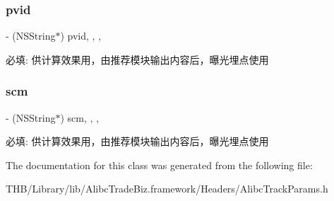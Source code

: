 \subsubsection{\texorpdfstring{pvid}{pvid}}
{\footnotesize\ttfamily -\/ (N\+S\+String$\ast$) pvid\hspace{0.3cm}{\ttfamily [read]}, {\ttfamily [write]}, {\ttfamily [nonatomic]}, {\ttfamily [strong]}}

必填\+: 供计算效果用，由推荐模块输出内容后，曝光埋点使用 \mbox{\label{interface_alibc_track_params_a705d775b617380e6ad56549633ad1153}} 
\subsubsection{\texorpdfstring{scm}{scm}}
{\footnotesize\ttfamily -\/ (N\+S\+String$\ast$) scm\hspace{0.3cm}{\ttfamily [read]}, {\ttfamily [write]}, {\ttfamily [nonatomic]}, {\ttfamily [strong]}}

必填\+: 供计算效果用，由推荐模块输出内容后，曝光埋点使用 

The documentation for this class was generated from the following file\+:\begin{DoxyCompactItemize}
\item 
T\+H\+B/\+Library/lib/\+Alibc\+Trade\+Biz.\+framework/\+Headers/Alibc\+Track\+Params.\+h\end{DoxyCompactItemize}
